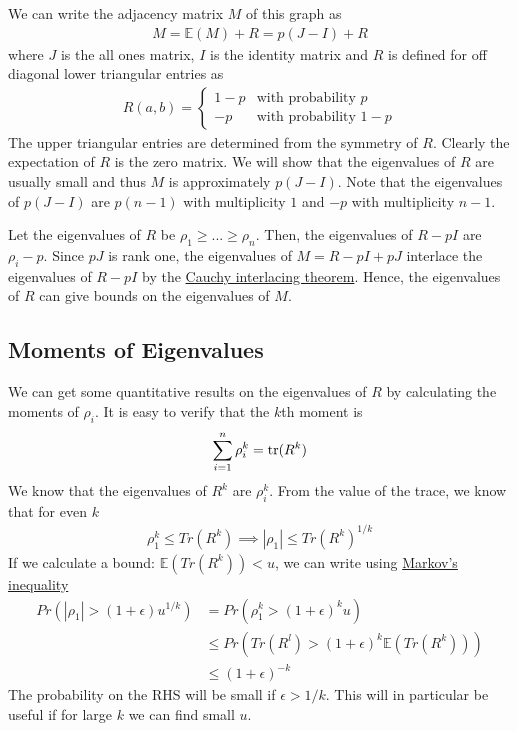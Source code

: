 \documentclass{math}
\newcommand{\expect}{\mathbb{E}}
\newcommand{\prob}{Pr}
\begin{document}
We can write the adjacency matrix $M$ of this graph as
\begin{align*}
    M = \expect(M) + R = p(J - I) + R
\end{align*}
where $J$ is the all ones matrix, $I$ is the identity matrix and $R$ is defined for off diagonal lower triangular entries as
\begin{align*}
    R(a, b) = \begin{cases}
                  1 - p & \text{with probability $p$}   \\
                  -p    & \text{with probability $1-p$}
              \end{cases}
\end{align*}
The upper triangular entries are determined from the symmetry of $R$.
Clearly the expectation of $R$ is the zero matrix.
We will show that the eigenvalues of $R$ are usually small
and thus $M$ is approximately $p(J - I)$. Note that the eigenvalues of $p(J - I)$ are $p(n - 1)$ with multiplicity $1$ and $-p$ with multiplicity $n - 1$.

Let the eigenvalues of $R$ be $\rho_1 \geq ... \geq \rho_n$.
Then, the eigenvalues of $R - pI$ are $\rho_i - p$.
Since $pJ$ is rank one, the eigenvalues of $M = R - pI + pJ$ interlace the eigenvalues of $R - pI$ by the \hyperref[thm:cauchy-rank-one]{Cauchy interlacing theorem}.
Hence, the eigenvalues of $R$ can give bounds on the eigenvalues of $M$.

\subsection{Moments of Eigenvalues}

We can get some quantitative results on the eigenvalues of $R$ by calculating the moments of $\rho_i$.
It is easy to verify that the $k$th moment is
\begin{align*}
    \sum_{i=1}^{n} \rho_i^k = \trace(R^k)
\end{align*}
We know that the eigenvalues of $R^k$ are $\rho_i^k$.
From the value of the trace, we know that for even $k$
\begin{align*}
    \rho_1^k \leq Tr(R^k) \implies |\rho_1| \leq Tr(R^k)^{1/k}
\end{align*}
If we calculate a bound: $\expect(Tr(R^k)) < u$, we can write using \hyperref[thm:markov]{Markov's inequality}
\begin{align*}
    \prob(|\rho_1| > (1 + \epsilon)u^{1 / k}) & = \prob(\rho_1^k > (1 + \epsilon)^k u)                  \\
                                              & \leq \prob(Tr(R^l) > (1 + \epsilon)^k \expect(Tr(R^k))) \\
                                              & \leq (1 + \epsilon)^{-k}
\end{align*}
The probability on the RHS will be small if $\epsilon > 1 / k$.
This will in particular be useful if for large $k$ we can find small $u$.
\end{document}
